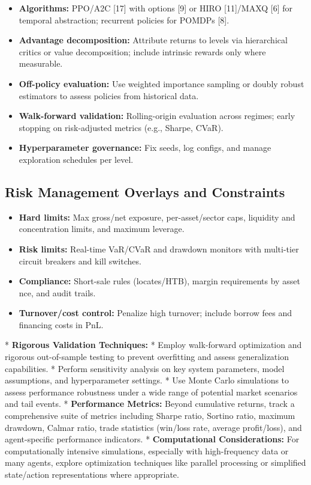 \documentclass[11pt]{article}
\begin{document}
\begin{itemize}
\item   \textbf{Algorithms:} PPO/A2C [17] with options [9] or HIRO [11]/MAXQ [6] for temporal abstraction; recurrent policies for POMDPs [8].
\item   \textbf{Advantage decomposition:} Attribute returns to levels via hierarchical critics or value decomposition; include intrinsic rewards only where measurable.
\item   \textbf{Off-policy evaluation:} Use weighted importance sampling or doubly robust estimators to assess policies from historical data.
\item   \textbf{Walk-forward validation:} Rolling-origin evaluation across regimes; early stopping on risk-adjusted metrics (e.g., Sharpe, CVaR).
\item   \textbf{Hyperparameter governance:} Fix seeds, log configs, and manage exploration schedules per level.

\end{itemize}
\subsection{Risk Management Overlays and Constraints}

\begin{itemize}
\item   \textbf{Hard limits:} Max gross/net exposure, per-asset/sector caps, liquidity and concentration limits, and maximum leverage.
\item   \textbf{Risk limits:} Real-time VaR/CVaR and drawdown monitors with multi-tier circuit breakers and kill switches.
\item   \textbf{Compliance:} Short-sale rules (locates/HTB), margin requirements by asset nce, and audit trails.
\item   \textbf{Turnover/cost control:} Penalize high turnover; include borrow fees and financing costs in PnL.
\end{itemize}
    *   \textbf{Rigorous Validation Techniques:}
        *   Employ walk-forward optimization and rigorous out-of-sample testing to prevent overfitting and assess generalization capabilities.
        *   Perform sensitivity analysis on key system parameters, model assumptions, and hyperparameter settings.
        *   Use Monte Carlo simulations to assess performance robustness under a wide range of potential market scenarios and tail events.
    *   \textbf{Performance Metrics:} Beyond cumulative returns, track a comprehensive suite of metrics including Sharpe ratio, Sortino ratio, maximum drawdown, Calmar ratio, trade statistics (win/loss rate, average profit/loss), and agent-specific performance indicators.
    *   \textbf{Computational Considerations:} For computationally intensive simulations, especially with high-frequency data or many agents, explore optimization techniques like parallel processing or simplified state/action representations where appropriate.
\end{document}
